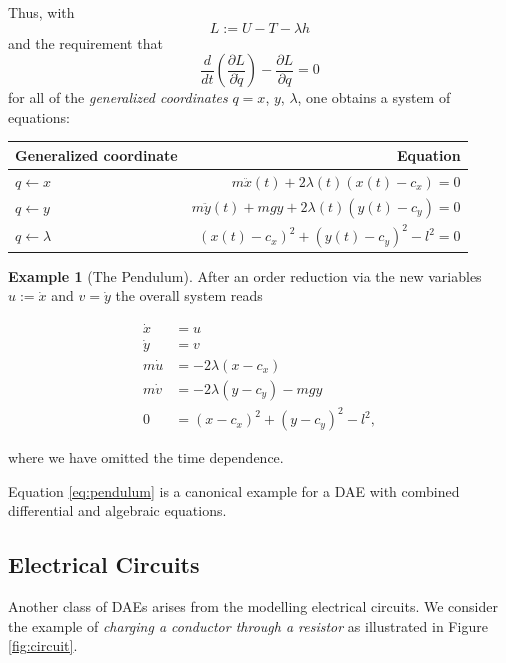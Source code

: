 \documentclass[]{book}
\theoremstyle{definition}
\theoremstyle{definition}
\newtheorem{example}{Example}[chapter]
\theoremstyle{definition}
\theoremstyle{definition}
\theoremstyle{remark}
\begin{document}
Thus, with \[L:=U-T- \lambda h\] and the requirement that
\[
\frac{d}{dt}(\frac{\partial L}{\partial \dot q}) - \frac{\partial L}{\partial q} = 0
\]
for all of the \emph{generalized coordinates} \(q=x\), \(y\), \(\lambda\),
one obtains a system of equations:

\begin{longtable}[]{@{}lr@{}}
\toprule
Generalized coordinate & Equation\tabularnewline
\midrule
\endhead
\(q \leftarrow x\) & \(m\ddot x(t) + 2 \lambda(t) (x(t) - c_x) = 0\)\tabularnewline
\(q \leftarrow y\) & \(m\ddot y(t) + mgy + 2 \lambda(t) (y(t) - c_y) = 0\)\tabularnewline
\(q \leftarrow \lambda\) & \((x(t) - c_x)^2 + (y(t) - c_y)^2 - l^2 =0\)\tabularnewline
\bottomrule
\end{longtable}

\begin{example}[The Pendulum]
\protect\hypertarget{exm:the-pendulum}{}{\label{exm:the-pendulum} {} }
After an order reduction via the new variables \(u:=\dot x\) and \(v=\dot y\) the overall system reads

\begin{equation}
\begin{split}
\dot x &= u \\
\dot y &= v \\
m \dot u &= - 2 \lambda (x - c_x) \\ 
m \dot v &= - 2 \lambda (y - c_y) - mgy \\
0&=(x - c_x)^2 + (y - c_y)^2 - l^2, 
\end{split}
\label{eq:pendulum}
\end{equation}

where we have omitted the time dependence.
\end{example}

Equation \eqref{eq:pendulum} is a canonical example for a DAE with combined differential and algebraic equations.

\hypertarget{electrical-circuits}{%
\subsection*{Electrical Circuits}\label{electrical-circuits}}

Another class of DAEs arises from the modelling electrical circuits. We consider the example of \emph{charging a conductor through a resistor} as illustrated in Figure \ref{fig:circuit}.
\end{document}
